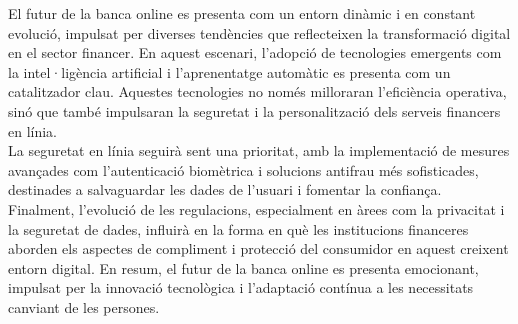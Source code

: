 



El futur de la banca online es presenta com un entorn dinàmic i en constant evolució, impulsat per diverses tendències que reflecteixen la transformació digital en el sector financer. En aquest escenari, l'adopció de tecnologies emergents com la intel·ligència artificial i l'aprenentatge automàtic es presenta com un catalitzador clau. Aquestes tecnologies no només milloraran l'eficiència operativa, sinó que també impulsaran la seguretat i la personalització dels serveis financers en línia.\\

La seguretat en línia seguirà sent una prioritat, amb la implementació de mesures avançades com l'autenticació biomètrica i solucions antifrau més sofisticades, destinades a salvaguardar les dades de l'usuari i fomentar la confiança.\\

Finalment, l'evolució de les regulacions, especialment en àrees com la privacitat i la seguretat de dades, influirà en la forma en què les institucions financeres aborden els aspectes de compliment i protecció del consumidor en aquest creixent entorn digital. En resum, el futur de la banca online es presenta emocionant, impulsat per la innovació tecnològica i l'adaptació contínua a les necessitats canviant de les persones.

